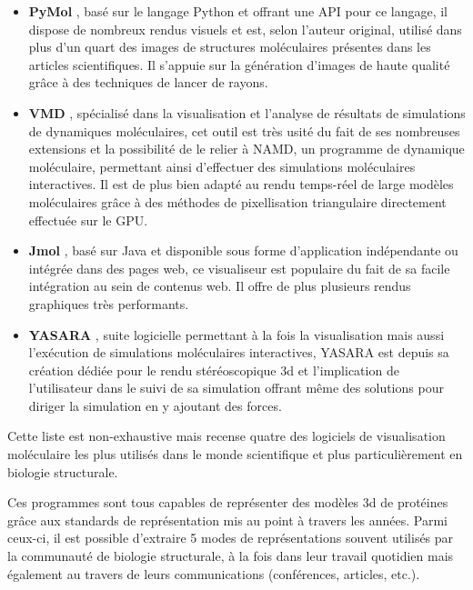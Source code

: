 \begin{itemize}
	\item \textbf{PyMol} \cite{delano_pymol_2002}, basé sur le langage Python et offrant une API pour ce langage, il dispose de nombreux rendus visuels et est, selon l'auteur original, utilisé dans plus d'un quart des images de structures moléculaires présentes dans les articles scientifiques. Il s'appuie sur la génération d'images de haute qualité grâce à des techniques de lancer de rayons.
	\item \textbf{VMD} \cite{humphrey_vmd:_1996}, spécialisé dans la visualisation et l'analyse de résultats de simulations de dynamiques moléculaires, cet outil est très usité du fait de ses nombreuses extensions et la possibilité de le relier à NAMD, un programme de dynamique moléculaire, permettant ainsi d'effectuer des simulations moléculaires interactives. Il est de plus bien adapté au rendu temps-réel de large modèles moléculaires grâce à des méthodes de pixellisation triangulaire directement effectuée sur le GPU.
	\item \textbf{Jmol} \cite{herraez2006biomolecules}, basé sur Java et disponible sous forme d'application indépendante ou intégrée dans des pages web, ce visualiseur est populaire du fait de sa facile intégration au sein de contenus web. Il offre de plus plusieurs rendus graphiques très performants.
	\item \textbf{YASARA} \cite{krieger2014yasara}, suite logicielle permettant à la fois la visualisation mais aussi l’exécution de simulations moléculaires interactives, YASARA est depuis sa création dédiée pour le rendu stéréoscopique 3d et l'implication de l'utilisateur dans le suivi de sa simulation offrant même des solutions pour diriger la simulation en y ajoutant des forces.
\end{itemize}

Cette liste est non-exhaustive mais recense quatre des logiciels de visualisation moléculaire les plus utilisés dans le monde scientifique et plus particulièrement en biologie structurale.

Ces programmes sont tous capables de représenter des modèles 3d de protéines grâce aux standards de représentation mis au point à travers les années. Parmi ceux-ci, il est possible d'extraire 5 modes de représentations souvent utilisés par la communauté de biologie structurale, à la fois dans leur travail quotidien mais également au travers de leurs communications (conférences, articles, etc.).

